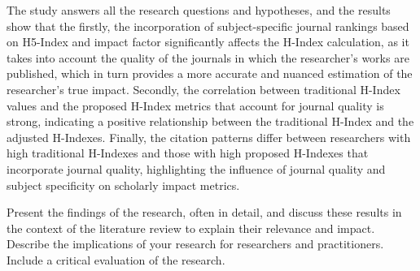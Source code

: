 
The study answers all the research questions and hypotheses, and the results
show that the firstly, the incorporation of subject-specific journal rankings
based on H5-Index and impact factor significantly affects the H-Index
calculation, as it takes into account the quality of the journals in which the
researcher’s works are published, which in turn provides a more accurate and
nuanced estimation of the researcher’s true impact. Secondly, the correlation
between traditional H-Index values and the proposed H-Index metrics that
account for journal quality is strong, indicating a positive relationship
between the traditional H-Index and the adjusted H-Indexes. Finally, the
citation patterns differ between researchers with high traditional H-Indexes
and those with high proposed H-Indexes that incorporate journal quality,
highlighting the influence of journal quality and subject specificity on
scholarly impact metrics.

Present the findings of the research, often in detail, and discuss these
results in the context of the literature review to explain their relevance and
impact. Describe the implications of your research for researchers and
practitioners. Include a critical evaluation of the research.

